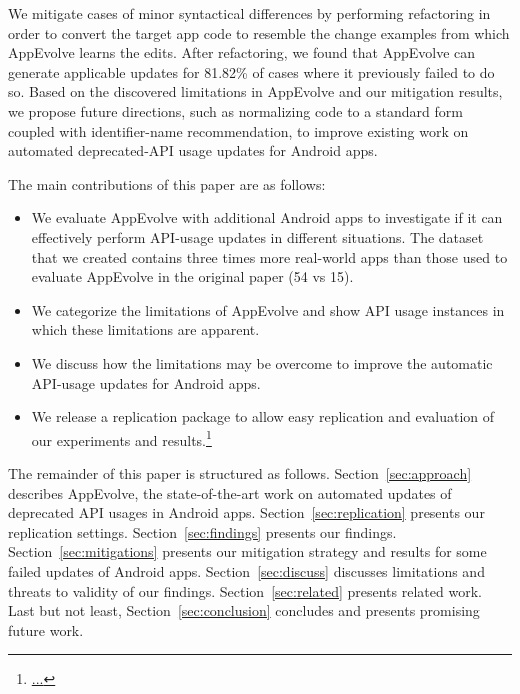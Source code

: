 We mitigate cases of minor syntactical differences by performing refactoring in order to convert the target app code to resemble the change examples from which AppEvolve learns the edits.
After refactoring, we found that AppEvolve can generate applicable updates for 81.82\% of cases where it previously failed to do so.
Based on the discovered limitations in AppEvolve and our mitigation results, we propose future directions, such as normalizing code to a standard form coupled with identifier-name recommendation, to improve existing work on automated deprecated-API usage updates for Android apps.

The main contributions of this paper are as follows:
\begin{itemize}
	\item We  evaluate AppEvolve with additional Android apps to investigate if it can effectively perform API-usage updates in different situations. The dataset that we created contains three times more real-world apps than those used to evaluate AppEvolve in the original paper (54 vs 15).
	\item We categorize the limitations of AppEvolve and show API usage instances in which these limitations are apparent.
	\item We discuss how the limitations may be overcome to improve the automatic API-usage updates for Android apps.
	\item We release a replication package to allow easy replication and evaluation of our experiments and results.\footnote{\url{...}}
	 
\end{itemize}

The remainder of this paper is structured as follows. Section~\ref{sec:approach} describes AppEvolve, the state-of-the-art work on automated updates of deprecated API usages in Android apps. Section~\ref{sec:replication} presents our replication settings. Section~\ref{sec:findings} presents our findings. Section~\ref{sec:mitigations} presents our mitigation strategy and results for some failed updates of Android apps.
Section~\ref{sec:discuss} discusses limitations and threats to validity of our findings.
Section~\ref{sec:related} presents related work.
Last but not least, Section~\ref{sec:conclusion} concludes and presents promising future work.
